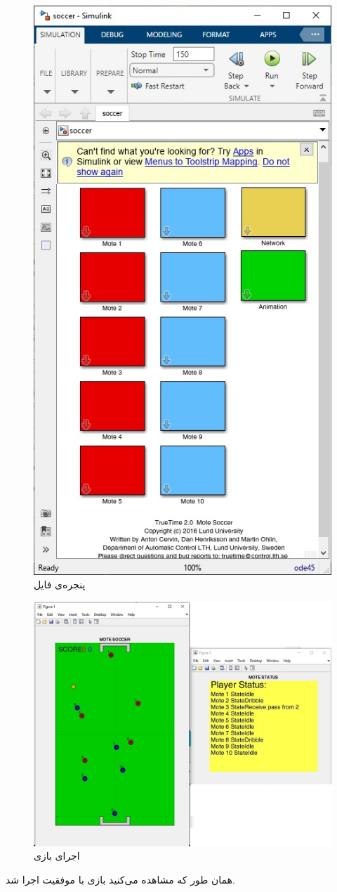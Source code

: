 \documentclass[]{article}
\begin{document}
\begin{figure}[H]
    \centering
    \includegraphics[scale=0.6]{pics/soccer.jpg}
    \caption{پنجره‌ی فایل }
\end{figure}
\begin{figure}[H]
    \centering
    \includegraphics[scale=0.5]{pics/soccer-run.jpg}
    \caption{اجرای بازی}
\end{figure}
همان طور که مشاهده می‌کنید بازی با موفقیت اجرا شد.
\end{document}

